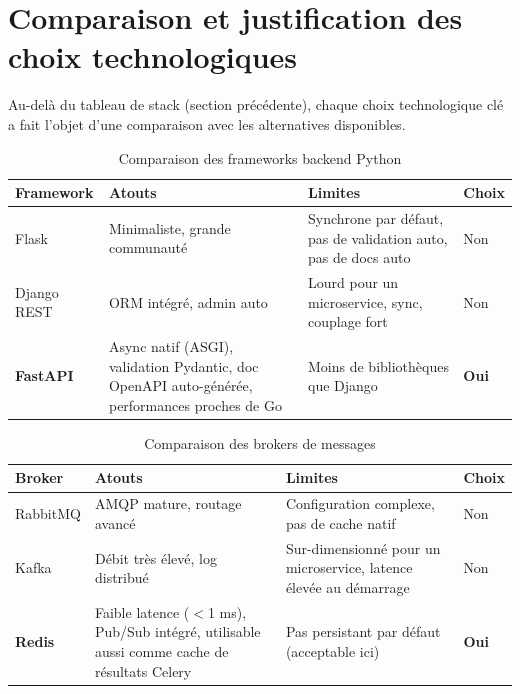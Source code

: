 \documentclass[12pt,a4paper,oneside]{report}
\newcommand{\theadrow}{\rowcolor{tekupblue!12}}
\begin{document}
\section{Comparaison et justification des choix technologiques}
\label{sec:techcompare}

Au-delà du tableau de stack (section précédente), chaque choix
technologique clé a fait l'objet d'une comparaison avec les alternatives
disponibles.

\begin{table}[H]
\centering
\caption{Comparaison des frameworks backend Python}
\label{tab:backend-compare}
\begin{tabularx}{\linewidth}{@{}lXXl@{}}
\toprule
\theadrow
\textbf{Framework} & \textbf{Atouts} & \textbf{Limites} & \textbf{Choix} \\\midrule
Flask
  & Minimaliste, grande communauté
  & Synchrone par défaut, pas de validation auto, pas de docs auto
  & Non \\
Django REST
  & ORM intégré, admin auto
  & Lourd pour un microservice, sync, couplage fort
  & Non \\
\textbf{FastAPI}
  & Async natif (ASGI), validation Pydantic, doc OpenAPI auto-générée,
    performances proches de Go
  & Moins de bibliothèques que Django
  & \textbf{Oui} \\
\bottomrule
\end{tabularx}
\end{table}

\begin{table}[H]
\centering
\caption{Comparaison des brokers de messages}
\label{tab:broker-compare}
\begin{tabularx}{\linewidth}{@{}lXXl@{}}
\toprule
\theadrow
\textbf{Broker} & \textbf{Atouts} & \textbf{Limites} & \textbf{Choix} \\\midrule
RabbitMQ
  & AMQP mature, routage avancé
  & Configuration complexe, pas de cache natif
  & Non \\
Kafka
  & Débit très élevé, log distribué
  & Sur-dimensionné pour un microservice, latence élevée au démarrage
  & Non \\
\textbf{Redis}
  & Faible latence ($<$1 ms), Pub/Sub intégré, utilisable aussi
    comme cache de résultats Celery
  & Pas persistant par défaut (acceptable ici)
  & \textbf{Oui} \\
\bottomrule
\end{tabularx}
\end{table}
\end{document}

